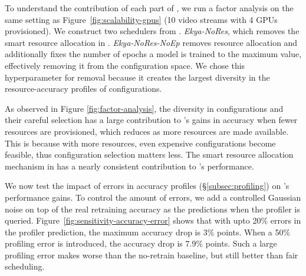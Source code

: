 To understand the contribution of each part of \name, we run a factor analysis on the same setting as Figure~\ref{fig:scalability-gpus} (10 video streams with 4 GPUs provisioned). We construct two schedulers from {\name}. \emph{Ekya-NoRes}, which removes the smart resource allocation in \name. \emph{Ekya-NoRes-NoEp} removes resource allocation and additionally fixes the number of epochs a model is trained to the maximum value, effectively removing it from the configuration space. We chose this hyperparameter for removal because it creates the largest diversity in the resource-accuracy profiles of configurations. 

As observed in Figure \ref{fig:factor-analysis}, the diversity in configurations and their careful selection has a large contribution to \name{}'s gains in accuracy when fewer resources are provisioned, which reduces as more resources are made available. This is because with more resources, even expensive configurations become feasible, thus configuration selection matters less. The smart resource allocation mechanism in {\name} has a nearly consistent contribution to \name{}'s performance.




We now test the impact of errors in accuracy profiles (\S\ref{subsec:profiling}) on \name's performance gains.
To control the amount of errors, we add a controlled Gaussian noise on top of the real retraining accuracy as the predictions when the profiler is queried. 
Figure~\ref{fig:sensitivity-accuracy-error} shows that with upto 20\% errors in the profiler prediction, the maximum accuracy drop is 3\% points. When a 50\% profiling error is introduced, the accuracy drop is 7.9\% points. Such a large profiling error makes \name{} worse than the no-retrain baseline, but still better than fair scheduling.


